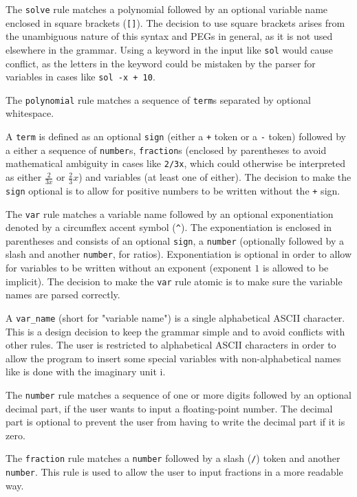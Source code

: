 The \verb|solve| rule matches a polynomial followed by an optional variable name enclosed in square brackets (\verb|[]|). The decision to use square brackets arises from the unambiguous nature of this syntax and PEGs in general, as it is not used elsewhere in the grammar. Using a keyword in the input like \verb|sol| would cause conflict, as the letters in the keyword could be mistaken by the parser for variables in cases like \verb|sol -x + 10|.

The \verb|polynomial| rule matches a sequence of \verb|term|s separated by optional whitespace.

A \verb|term| is defined as an optional \verb|sign| (either a \verb|+| token or a \verb|-| token) followed by a either a sequence of \verb|number|s, \verb|fraction|s (enclosed by parentheses to avoid mathematical ambiguity in cases like \verb|2/3x|, which could otherwise be interpreted as either $\frac{2}{3x}$ or $\frac{2}{3}x$) and variables (at least one of either). The decision to make the \verb|sign| optional is to allow for positive numbers to be written without the \verb|+| sign.

The \verb|var| rule matches a variable name followed by an optional exponentiation denoted by a circumflex accent symbol (\verb|^|). The exponentiation is enclosed in parentheses and consists of an optional \verb|sign|, a \verb|number| (optionally followed by a slash and another \verb|number|, for ratios). Exponentiation is optional in order to allow for variables to be written without an exponent (exponent $1$ is allowed to be implicit). The decision to make the \verb|var| rule atomic is to make sure the variable names are parsed correctly.

A \verb|var_name| (short for "variable name") is a single alphabetical ASCII character. This is a design decision to keep the grammar simple and to avoid conflicts with other rules. The user is restricted to alphabetical ASCII characters in order to allow the program to insert some special variables with non-alphabetical names like is done with the imaginary unit $\mathrm{i}$.

The \verb|number| rule matches a sequence of one or more digits followed by an optional decimal part, if the user wants to input a floating-point number. The decimal part is optional to prevent the user from having to write the decimal part if it is zero.

The \verb|fraction| rule matches a \verb|number| followed by a slash (\verb|/|) token and another \verb|number|. This rule is used to allow the user to input fractions in a more readable way.

